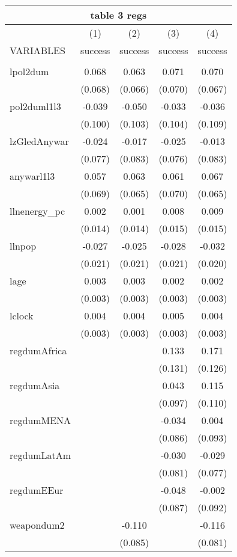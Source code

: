 \documentclass[]{article}
\begin{document}
\begin{tabular}{lcccc}
\multicolumn{5}{c}{table 3 regs} \\ \hline
 & (1) & (2) & (3) & (4) \\
VARIABLES & success & success & success & success \\ \hline
 &  &  &  &  \\
lpol2dum & 0.068 & 0.063 & 0.071 & 0.070 \\
 & (0.068) & (0.066) & (0.070) & (0.067) \\
pol2duml1l3 & -0.039 & -0.050 & -0.033 & -0.036 \\
 & (0.100) & (0.103) & (0.104) & (0.109) \\
lzGledAnywar & -0.024 & -0.017 & -0.025 & -0.013 \\
 & (0.077) & (0.083) & (0.076) & (0.083) \\
anywarl1l3 & 0.057 & 0.063 & 0.061 & 0.067 \\
 & (0.069) & (0.065) & (0.070) & (0.065) \\
llnenergy\_pc & 0.002 & 0.001 & 0.008 & 0.009 \\
 & (0.014) & (0.014) & (0.015) & (0.015) \\
llnpop & -0.027 & -0.025 & -0.028 & -0.032 \\
 & (0.021) & (0.021) & (0.021) & (0.020) \\
lage & 0.003 & 0.003 & 0.002 & 0.002 \\
 & (0.003) & (0.003) & (0.003) & (0.003) \\
lclock & 0.004 & 0.004 & 0.005 & 0.004 \\
 & (0.003) & (0.003) & (0.003) & (0.003) \\
regdumAfrica &  &  & 0.133 & 0.171 \\
 &  &  & (0.131) & (0.126) \\
regdumAsia &  &  & 0.043 & 0.115 \\
 &  &  & (0.097) & (0.110) \\
regdumMENA &  &  & -0.034 & 0.004 \\
 &  &  & (0.086) & (0.093) \\
regdumLatAm &  &  & -0.030 & -0.029 \\
 &  &  & (0.081) & (0.077) \\
regdumEEur &  &  & -0.048 & -0.002 \\
 &  &  & (0.087) & (0.092) \\
weapondum2 &  & -0.110 &  & -0.116 \\
 &  & (0.085) &  & (0.081) \\

\end{tabular}
\end{document}
